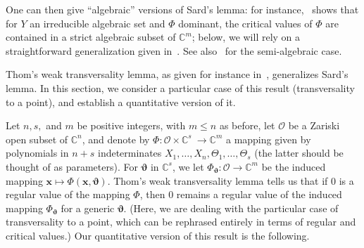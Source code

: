 \documentclass[12pt]{article}
\def\thetab{\bm{\vartheta}}
\def\xb{{\bm x}}
\def\vt{\vartheta}
\def\dt{s}
\def\C{\mathbb{C}}
\begin{document}
One can then give ``algebraic'' versions of Sard's lemma: for
instance,~\cite[(3.7)]{Mumford76} shows that for $Y$ an irreducible
algebraic set and $\Phi$ dominant, the critical values of $\Phi$ are
contained in a strict algebraic subset of $\C^m$; below, we will rely
on a straightforward generalization given in~\cite{TWT}. See
also~\cite[Chapter~9]{bochnak1998real} for the semi-algebraic case.

Thom's weak transversality lemma, as given for instance
in~\cite{demazure2000bifurcations}, generalizes Sard's lemma. In this
section, we consider a particular case of this result (transversality
to a point), and establish a quantitative version of it.

Let $n,\dt,$ and $m$ be positive integers, with $m \le n$ as before,
let $\mathscr{O}$ be a Zariski open subset of $\C^n$, and denote by
$\Phi: \mathscr{O} \times \C^{\dt} ~ \rightarrow \C^{m}$ a mapping
given by polynomials in $n+\dt$ indeterminates
$X_1,\dots,X_n,\Theta_1,\dots,\Theta_\dt$ (the latter should be
thought of as parameters). For $\thetab$ in $\C^{\dt}$, we let
$\Phi_{\thetab} : \mathscr{O} \rightarrow \C^{m}$ be the induced
mapping $\xb\mapsto\Phi(\xb,\thetab)$.  Thom's weak transversality
lemma tells us that if $0$ is a regular value of the mapping $\Phi$,
then $0$ remains a regular value of the induced mapping $\Phi_{\bm
  \vt}$ for a generic $\bm \vt$. (Here, we are dealing with the
particular case of transversality to a point, which can be rephrased
entirely in terms of regular and critical values.)  Our quantitative
version of this result is the following.
\end{document}

